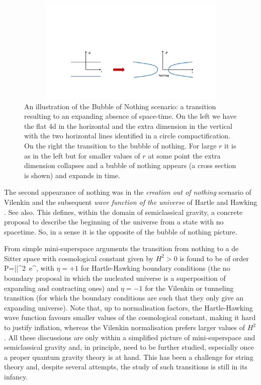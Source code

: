 \begin{figure}[t]
\begin{center}
\includegraphics[width=170mm,height=50mm]{Sections/Figures/BON.pdf} 
\caption{An illustration of the Bubble of Nothing scenario: a transition resulting to an expanding absence of space-time. On the left we have the flat 4d in the horizontal  and the extra dimension in the vertical with the two horizontal lines identified in a circle compactification. On the right the transition to the bubble of nothing. For large $r$ it is as in the left but for smaller values of $r$ at some point the extra dimension collapses and a bubble of nothing appears (a cross section is shown) and expands in time.} \label{bon}
\end{center}
\end{figure}

The second appearance of nothing was in the {\it creation out of nothing} scenario of Vilenkin \cite{Vilenkin:1982de,Vilenkin:1983xq,Vilenkin:1984wp} and the subsequent {\it wave function of the universe} of Hartle and Hawking \cite{Hartle:1983ai}. See also\cite{Linde:1983mx,Rubakov:1999qk,Hartle:2022jkt}. This  defines, within the domain of semiclassical gravity, a concrete proposal to describe the beginning of the universe from a state with no spacetime. So, in a sense it is the opposite of the bubble of nothing picture. 

From simple mini-superspace arguments the transition from nothing to a de Sitter space with cosmological constant given by $H^2>0$ is found to be of order 
\be
{\mathcal P}=|\Psi|^2\propto\, e^,
\ee
with $\eta=+1$ for Hartle-Hawking boundary conditions (the no boundary proposal in which the nucleated universe is a superposition of expanding and contracting ones) and $\eta=-1$ for the Vilenkin or tunneling transition (for which the boundary conditions are such that they only give an expanding universe). Note that, up to normalisation factors, the Hartle-Hawking wave function favours smaller values of the cosmological constant, making it hard to justify inflation, whereas the Vilenkin normalisation prefers larger values of $H^2$. All these discussions are only within a simplified picture of mini-superspace and semiclassical gravity and, in principle, need to be further studied, especially once a proper quantum gravity theory is at hand. This has been a challenge for string theory and, despite several attempts, the study of such transitions is still in its infancy.

